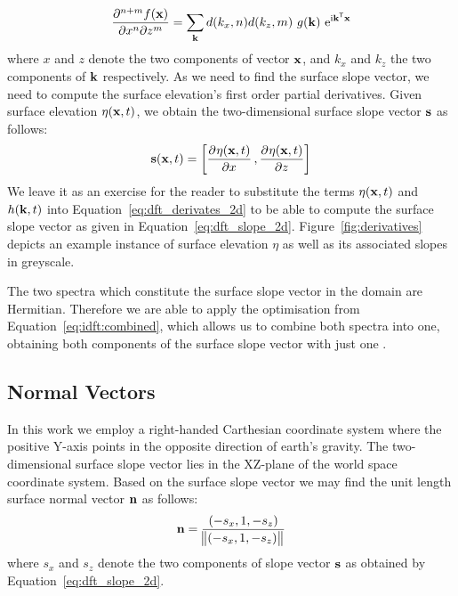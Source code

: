 \begin{equation}
\label{eq:dft_derivates_2d}
 \dmd{f(\mvec{x})}{n+m}{x}{n}{z}{m} = \sum_{\mvec{k}}d(k_{x}, n)d(k_{z}, m)~g(\mvec{k})~\mathrm{e}^{\mathrm{i}\transpose{\mvec{k}}\mvec{x}}
\end{equation}
where $x$ and $z$ denote the two components of vector $\mathbf{x}$, and $k_x$ and $k_z$ 
the two components of \wavevector $\mathbf{k}$ respectively.
As we need to find the surface slope vector, we need to compute 
the surface elevation's first order partial derivatives. Given surface 
elevation $\eta(\mathbf{x},t)$, we obtain the two-dimensional surface slope 
vector $\mathbf{s}$ as follows:
\begin{equation}
\label{eq:dft_slope_2d}
 \mvec{s}(\mvec{x},t) = \left[\dpd{\eta(\mvec{x},t)}{x}, \dpd{\eta(\mvec{x},t)}{z}\right]
\end{equation}
We leave it as an exercise for the reader to substitute the terms $\eta(\mathbf{x},t)$
and $h(\mathbf{k},t)$ into Equation~\ref{eq:dft_derivates_2d} to be able to
compute the surface slope vector as given in Equation~\ref{eq:dft_slope_2d}.
Figure~\ref{fig:derivatives} depicts an example instance of surface 
elevation $\eta$ as well as its associated slopes in greyscale.

The two spectra which constitute the surface slope vector in the \wavevector domain
are Hermitian. Therefore we are able to apply the optimisation from
Equation~\ref{eq:idft:combined}, which allows us to combine both spectra into one,
obtaining both components of the surface slope vector with just one \InvFourierTransform.
%
\subsection{Normal Vectors}
%
In this work we employ a right-handed Carthesian coordinate system where the positive
Y-axis points in the opposite direction of earth's gravity.
The two-dimensional surface slope vector lies in the XZ-plane of the world space
coordinate system. Based on the surface slope vector we may find the unit
length surface normal vector $\mathbf{n}$ as follows:
\begin{equation*}
 \mathbf{n} = \frac{(-s_x, 1, -s_z)}{\norm{(-s_x, 1, -s_z)}}
\end{equation*}
where $s_x$ and $s_z$ denote the two components of slope vector $\mathbf{s}$
as obtained by Equation~\ref{eq:dft_slope_2d}.
%
